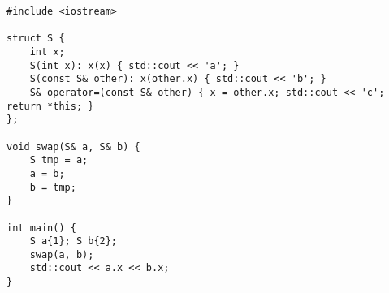 \begin{lstlisting}[title=\href{https://godbolt.org/z/ohe3Wb}{\texttt{godbolt.org/z/ohe3Wb}}]
#include <iostream>

struct S { 
    int x;
    S(int x): x(x) { std::cout << 'a'; }
    S(const S& other): x(other.x) { std::cout << 'b'; }
    S& operator=(const S& other) { x = other.x; std::cout << 'c'; return *this; }
};

void swap(S& a, S& b) {
    S tmp = a;
    a = b;
    b = tmp;
}

int main() {
    S a{1}; S b{2};
    swap(a, b);
    std::cout << a.x << b.x;
}
\end{lstlisting}
